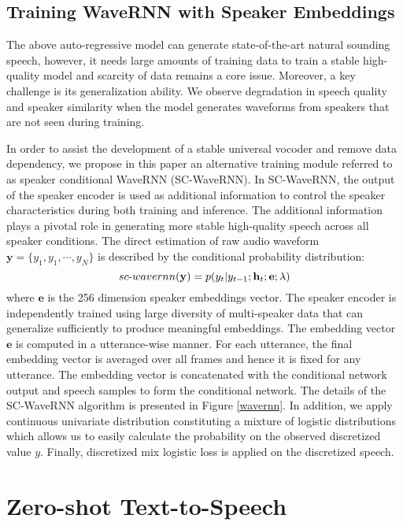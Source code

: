 \documentclass[a4paper]{article}
\begin{document}
\subsection{Training WaveRNN with Speaker Embeddings}

The above auto-regressive model can generate state-of-the-art natural sounding speech, however, it needs large amounts of training data to train a stable high-quality model and scarcity of data remains a core issue. Moreover, a key challenge is its generalization ability. We observe degradation in speech quality and speaker similarity when the model generates waveforms from speakers that are not seen during training.

In order to assist the development of a stable universal vocoder and remove data dependency, we propose in this paper an alternative training module referred to as speaker conditional WaveRNN (SC-WaveRNN). In SC-WaveRNN, the output of the speaker encoder is used as additional information to control the speaker characteristics during both training and inference. The additional information plays a pivotal role in generating more stable high-quality speech across all speaker conditions. The direct estimation of raw audio waveform $ \mathbf{y} = \{y_{1}, y_{1} ,\cdots, y_{N}\}$ is described by the conditional probability distribution:
\vspace{-2mm}
\[
\vspace{-2mm}
    sc{\text -}wavernn(\mathbf{y}) = p(y_{t}|y_{t-1};\mathbf{h}_{t};\mathbf{e};\mathbf{\lambda})
\]
where $\mathbf{e}$ is the 256 dimension speaker embeddings vector. The speaker encoder is independently trained using large diversity of multi-speaker data that can generalize sufficiently to produce meaningful embeddings. The embedding vector $\mathbf{e}$ is computed in a utterance-wise manner. For each utterance, the final embedding vector is averaged over all frames and hence it is fixed for any utterance. The embedding vector is concatenated with the conditional network output and speech samples to form the conditional network. The details of the SC-WaveRNN algorithm is presented in Figure \ref{wavernn}. In addition, we apply continuous univariate distribution constituting a mixture of logistic distributions \cite{oord2017parallel} which allows us to easily calculate the probability on the observed discretized value $y$. Finally, discretized mix logistic loss is applied on the discretized speech.

\vspace{-2mm}
\section{Zero-shot Text-to-Speech}
\end{document}
